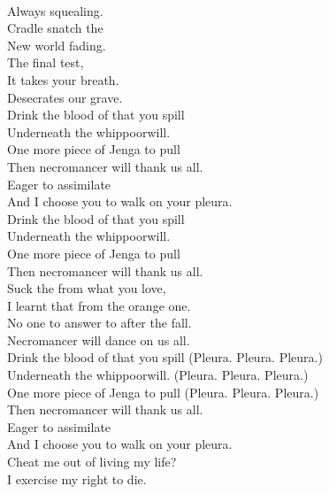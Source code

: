  \\
Always squealing. \\
Cradle snatch the \\
New world fading. \\
The final test, \\
It takes your breath. \\
Desecrates our grave. \\

Drink the blood of that you spill \\
Underneath the whippoorwill. \\
One more piece of Jenga to pull \\
Then necromancer will thank us all. \\

Eager to assimilate \\
And I choose you to walk on your pleura. \\

Drink the blood of that you spill \\
Underneath the whippoorwill. \\
One more piece of Jenga to pull \\
Then necromancer will thank us all. \\

Suck the  from what you love, \\
I learnt that from the orange one. \\
No one to answer to after the fall. \\
Necromancer will dance on us all. \\

Drink the blood of that you spill (Pleura. Pleura. Pleura.) \\
Underneath the whippoorwill. (Pleura. Pleura. Pleura.) \\
One more piece of Jenga to pull (Pleura. Pleura. Pleura.) \\
Then necromancer will thank us all. \\

Eager to assimilate \\
And I choose you to walk on your pleura. \\
Cheat me out of living my life? \\
I exercise my right to die. \\



